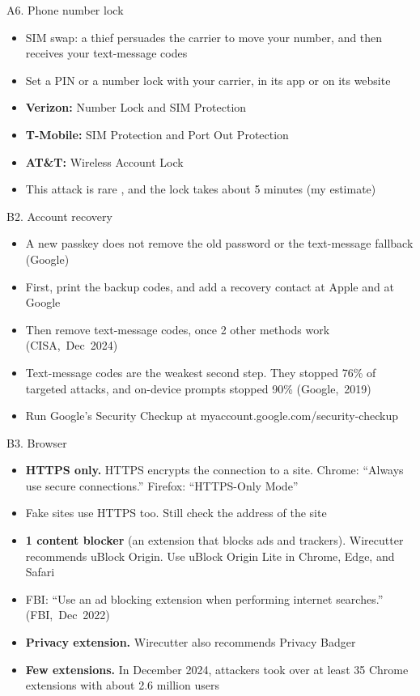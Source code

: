 \documentclass[11pt]{beamer}
\newcommand{\srccite}[1]{{\scriptsize\textcolor{citecol}{#1}}}
\newcommand{\vfy}{\unskip}
\newcommand{\vfy}{\unskip\nobreakspace{\scriptsize\textcolor{citecol}{[verify]}}}
\renewcommand{\srccite}[1]{{\scriptsize\textcolor{citecol}{\mbox{#1}}}}
\begin{document}
\begin{frame}{A6. Phone number lock}
\pause
\begin{itemize}\setlength\itemsep{9pt}
\item SIM swap: a thief persuades the carrier to move your number, and then receives your text-message codes \pause
\item Set a PIN or a number lock with your carrier, in its app or on its website \pause
\item \textbf{Verizon:} Number Lock and SIM Protection \vfy \pause
\item \textbf{T-Mobile:} SIM Protection and Port Out Protection \vfy \pause
\item \textbf{AT\&T:} Wireless Account Lock \vfy \pause
\item This attack is rare \vfy, and the lock takes about 5 minutes (my estimate)
\end{itemize}
\end{frame}


\begin{frame}{B2. Account recovery}
\pause
\begin{itemize}\setlength\itemsep{8pt}
\item A new passkey does not remove the old password or the text-message fallback \srccite{(Google)} \vfy \pause
\item First, print the backup codes, and add a recovery contact at Apple and at Google \vfy \pause
\item Then remove text-message codes, once 2 other methods work \srccite{(CISA, Dec 2024)} \vfy \pause
\item Text-message codes are the weakest second step. They stopped 76\% of targeted attacks, and on-device prompts stopped 90\% \srccite{(Google, 2019)} \vfy \pause
\item Run Google's Security Checkup at myaccount.google.com/security-checkup \vfy
\end{itemize}
\end{frame}


\begin{frame}{B3. Browser}
\pause
\begin{itemize}\setlength\itemsep{7pt}
\item \textbf{HTTPS only.} HTTPS encrypts the connection to a site. Chrome: ``Always use secure connections.'' Firefox: ``HTTPS-Only Mode'' \vfy \pause
\item Fake sites use HTTPS too. Still check the address of the site \pause
\item \textbf{1 content blocker} (an extension that blocks ads and trackers). Wirecutter recommends uBlock Origin. Use uBlock Origin Lite in Chrome, Edge, and Safari \vfy \pause
\item FBI: ``Use an ad blocking extension when performing internet searches.'' \srccite{(FBI, Dec 2022)} \vfy \pause
\item \textbf{Privacy extension.} Wirecutter also recommends Privacy Badger \vfy \pause
\item \textbf{Few extensions.} In December 2024, attackers took over at least 35 Chrome extensions with about 2.6 million users \vfy
\end{itemize}
\end{frame}
\end{document}
